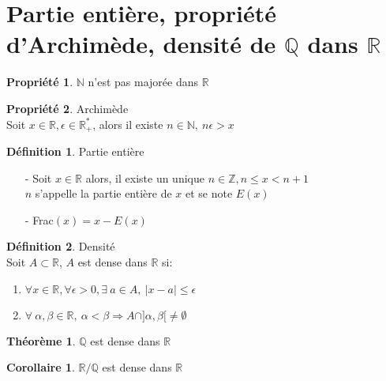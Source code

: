 \documentclass[fleqn]{article}
\theoremstyle{definition} \newtheorem*{defi}{D\'efinition}
\theoremstyle{definition} \newtheorem*{theo}{Th\'eor\`eme}
\theoremstyle{definition} \newtheorem*{coro}{Corollaire}
\theoremstyle{remark} \newtheorem*{rqs}{Remarques}
\theoremstyle{definition} \newtheorem*{prop}{Propri\'et\'e}
\begin{document}
\section{Partie entière, propri\'et\'e d'Archim\`ede, densit\'e de $\mathbb{Q}$ dans $\mathbb{R}$}
\begin{prop}
	$\mathbb{N}$ n'est pas major\'ee dans $\mathbb{R}$
\end{prop}
\begin{prop} Archim\`ede \\
	Soit $x \in \mathbb{R}, \epsilon \in \mathbb{R}_+^*$, alors il existe $n \in \mathbb{N},\ n\epsilon>x$
\end{prop}
\begin{defi} Partie enti\`ere
	\begin{itemize}
		\item [-] Soit $x \in \mathbb{R}$ alors, il existe un unique $n \in \mathbb{Z}, n \leq x < n+1$ \\
			$n$ s'appelle la partie enti\`ere de $x$ et se note $E(x)$
		\item [-] Frac$(x) = x - E(x)$
	\end{itemize}
\end{defi}
\begin{defi} Densit\'e \\
	Soit $A \subset \mathbb{R}$, $A$ est dense dans $\mathbb{R}$ si:
	\begin{enumerate}
		\item $\forall x \in \mathbb{R}, \forall \epsilon > 0, \exists\ a \in A,\ |x-a| \leq \epsilon$
		\item $\forall\ \alpha,\beta \in \mathbb{R},\ \alpha < \beta \Rightarrow A \cap ]\alpha, \beta[ \neq \emptyset$
	\end{enumerate}
	\begin{theo} $\mathbb{Q}$ est dense dans $\mathbb{R}$ \end{theo}
	\begin{coro} $\mathbb{R}/\mathbb{Q}$ est dense dans $\mathbb{R}$ \end{coro}
\end{defi}
\end{document}
